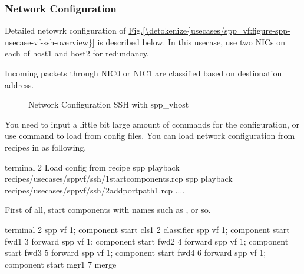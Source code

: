 \documentclass[a4paper,11pt,openany,oneside,english]{sphinxmanual}
\begin{document}
\subsubsection{Network Configuration}
\label{\detokenize{usecases/spp_vf:id2}}
Detailed netowrk configuration of \hyperref[\detokenize{usecases/spp_vf:figure-spp-usecase-vf-ssh-overview}]{Fig.\@ \ref{\detokenize{usecases/spp_vf:figure-spp-usecase-vf-ssh-overview}}}
is described below.
In this usecase, use two NICs on each of host1 and host2 for redundancy.

Incoming packets through NIC0 or NIC1 are classified based on destionation
address.

\begin{figure}[htbp]
\centering
\capstart

\noindent{}
\caption{Network Configuration SSH with spp\_vhost}\label{\detokenize{usecases/spp_vf:id6}}\label{\detokenize{usecases/spp_vf:figure-network-config}}\end{figure}

You need to input a little bit large amount of commands for the
configuration, or use  command to load from config files.
You can load network configuration  from recipes in 
as following.

\begin{sphinxVerbatim}[commandchars=\\\{\},formatcom=\footnotesize]
\PYGZsh{} terminal 2
\PYGZsh{} Load config from recipe
spp \PYGZgt{} playback recipes/usecases/spp\PYGZus{}vf/ssh/1\PYGZhy{}start\PYGZus{}components.rcp
spp \PYGZgt{} playback recipes/usecases/spp\PYGZus{}vf/ssh/2\PYGZhy{}add\PYGZus{}port\PYGZus{}path1.rcp
....
\end{sphinxVerbatim}

First of all, start components with names such as ,  or so.

\begin{sphinxVerbatim}[commandchars=\\\{\},formatcom=\footnotesize]
\PYGZsh{} terminal 2
spp \PYGZgt{} vf 1; component start cls1 2 classifier
spp \PYGZgt{} vf 1; component start fwd1 3 forward
spp \PYGZgt{} vf 1; component start fwd2 4 forward
spp \PYGZgt{} vf 1; component start fwd3 5 forward
spp \PYGZgt{} vf 1; component start fwd4 6 forward
spp \PYGZgt{} vf 1; component start mgr1 7 merge
\end{sphinxVerbatim}
\end{document}
